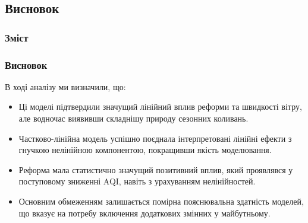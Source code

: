 \documentclass{beamer}
\begin{document}
\begin{frame}
  \section{Висновок}

  \frametitle{Зміст}
  \tableofcontents[currentsection]
\end{frame}


\begin{frame}
  \frametitle{Висновок}
  
  В ході аналізу ми визначили, що:
  
   \begin{itemize}
    \item Ці моделі підтвердили значущий лінійний вплив реформи та швидкості вітру, але водночас виявивши складнішу природу сезонних коливань. 
    \item Частково-лінійна модель успішно поєднала інтерпретовані лінійні ефекти з гнучкою нелінійною компонентою, покращивши якість моделювання. 
    \item Реформа мала статистично значущий позитивний вплив, який проявлявся у поступовому зниженні AQI, навіть з урахуванням нелінійностей.
    \item Основним обмеженням залишається помірна пояснювальна здатність моделей, що вказує на потребу включення додаткових змінних у майбутньому.
  \end{itemize}
\end{frame}
\end{document}
